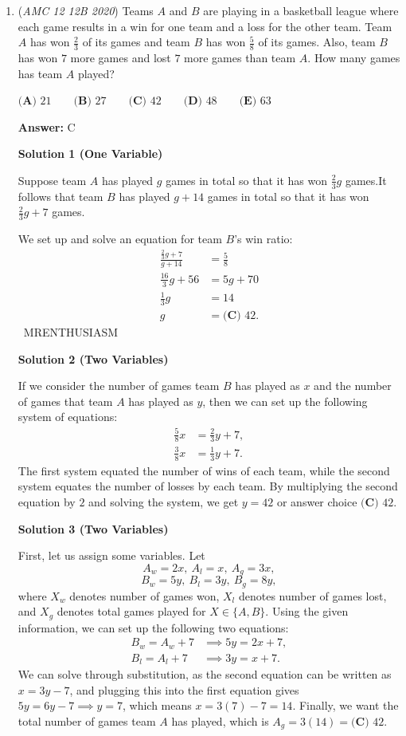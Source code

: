 \begin{enumerate}
	\item (\textit{AMC 12 12B 2020}) Teams $A$ and $B$ are playing in a basketball league where each game results in a win for one team and a loss for the other team. Team $A$ has won $\frac{2}{3}$ of its games and team $B$ has won $\frac{5}{8}$ of its games. Also, team $B$ has won $7$ more games and lost $7$ more games than team $A.$ How many games has team $A$ played?


 $\textbf{(A) } 21 \qquad \textbf{(B) } 27 \qquad \textbf{(C) } 42 \qquad \textbf{(D) } 48 \qquad \textbf{(E) } 63$

 \textbf{Answer: }C



\textbf{Solution 1 (One Variable)}

Suppose team $A$ has played $g$ games in total so that it has won $\frac23g$ games.It follows that team $B$ has played $g+14$ games in total so that it has won $\frac23g+7$ games.

 We set up and solve an equation for team $B$'s win ratio:
 \begin{align*} \frac{\frac23g+7}{g+14}&=\frac58 \\ \frac{16}{3}g+56&=5g+70 \\ \frac13g&=14 \\ g&=\boxed{\textbf{(C) } 42}. \end{align*}
~MRENTHUSIASM

 



\textbf{Solution 2 (Two Variables)}

If we consider the number of games team $B$ has played as $x$ and the number of games that team $A$ has played as $y$, then we can set up the following system of equations:
 \begin{align*} \frac{5}{8}x &= \frac{2}{3}y+7, \\ \frac{3}{8}x &= \frac{1}{3}y+7. \end{align*}
The first system equated the number of wins of each team, while the second system equates the number of losses by each team. By multiplying the second equation by $2$ and solving the system, we get $y = 42$ or answer choice $\boxed{\textbf{(C) } 42}.$




\textbf{Solution 3 (Two Variables)}

First, let us assign some variables. Let
 \[A_w=2x, \ A_l=x, \ A_g=3x,\]
 \[B_w=5y, \ B_l=3y, \ B_g=8y,\]where $X_w$ denotes number of games won, $X_l$ denotes number of games lost, and $X_g$ denotes total games played for $X\in \{A, B\}$. Using the given information, we can set up the following two equations:
 \begin{align*} B_w=A_w+7&\implies 5y=2x+7, \\ B_l=A_l+7&\implies 3y=x+7. \end{align*}
We can solve through substitution, as the second equation can be written as $x=3y-7$, and plugging this into the first equation gives $5y=6y-7\implies y=7$, which means $x=3(7)-7=14$. Finally, we want the total number of games team $A$ has played, which is $A_g=3(14)=\boxed{\textbf{(C) } 42}$.


\end{enumerate}
